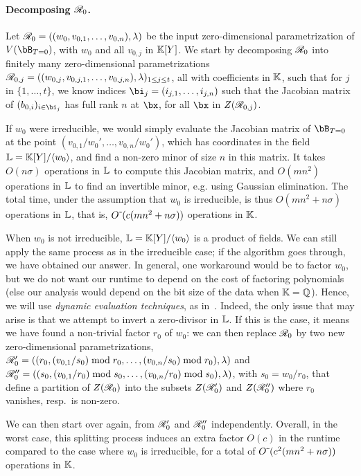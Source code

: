 \documentclass[12pt]{article}
\begin{document}
\paragraph{Decomposing $\mathscr{R}_0$.}
Let $\mathscr{R}_0 =((w_{0},v_{0,1},\dots,v_{0,n}),\lambda)$ be the input
zero-dimensional parametrization of $V(\bB_{T=0})$, with $w_0$ and all
$v_{0,j}$ in $\mathbb{K}[Y]$.  We start by decomposing $\mathscr{R}_0$ into
finitely many zero-dimensional parametrizations
$\mathscr{R}_{0,j}=((w_{0,j},v_{0,j,1},\dots,v_{0,j,n}),\lambda)_{1\le j\le
  t}$, all with coefficients in $\mathbb{K}$, such that for $j$ in
$\{1,\dots,t\}$, we know indices $\bi_j=(i_{j,1},\dots,i_{j,n})$ such that
the Jacobian matrix of $(b_{0,i})_{i \in \bi_j}$ has full rank $n$ at
$\bx$, for all $\bx$ in $Z(\mathscr{R}_{0,j})$.

If $w_0$ were irreducible, we would simply evaluate the Jacobian
matrix of $\bB_{T=0}$ at the point $(v_{0,1}/w_0',\dots,v_{0,n}/w_0')$,
which has coordinates in the field $\mathbb{L}=\mathbb{K}[Y]/\langle w_0 \rangle$,
and find a non-zero minor of size $n$ in this matrix. It takes
$O(n \sigma)$ operations in $\mathbb{L}$ to compute this Jacobian matrix, and
$O(mn^2)$ operations in $\mathbb{L}$ to find an invertible minor, e.g. using
Gaussian elimination. The total time, under the assumption that $w_0$
is irreducible, is thus $O(mn^2 + n\sigma)$ operations in $\mathbb{L}$, that is,
${O}{\,\tilde{ }\,}(c (mn^2 + n\sigma) )$ operations in $\mathbb{K}$.

When $w_0$ is not irreducible, $\mathbb{L}=\mathbb{K}[Y]/\langle w_0 \rangle$ is a
product of fields. We can still apply the same process as in the
irreducible case; if the algorithm goes through, we have obtained our
answer. In general, one workaround would be to factor $w_0$, but we do
not want our runtime to depend on the cost of factoring polynomials
(else our analysis would depend on the bit size of the data when
$\mathbb{K}=\mathbb{Q}$). Hence, we will use {\em dynamic evaluation
  techniques}, as in~\cite{D5}. Indeed, the only issue that may arise
is that we attempt to invert a zero-divisor in $\mathbb{L}$. If this is the case, it
means we have found a non-trivial factor $r_0$ of $w_0$: we can then
replace $\mathscr{R}_0$ by two new zero-dimensional parametrizations,
$\mathscr{R}'_0=((r_0,(v_{0,1}/s_0) \bmod r_0,\dots,(v_{0,n}/s_0)\bmod
r_0),\lambda)$
and
$\mathscr{R}''_0=((s_0,(v_{0,1}/r_0) \bmod s_0,\dots,(v_{0,n}/ r_0)\bmod
s_0),\lambda)$,
with $s_0=w_0/r_0$, that define a partition of $Z(\mathscr{R}_0)$ into the
subsets $Z(\mathscr{R}'_0)$ and $Z(\mathscr{R}''_0)$ where $r_0$ vanishes, resp.\
is non-zero.

We can then start over again, from $\mathscr{R}'_0$ and $\mathscr{R}''_0$
independently. Overall, in the worst case, this splitting process
induces an extra factor $O(c)$ in the runtime compared to the case
where $w_0$ is irreducible, for a total of ${O}{\,\tilde{ }\,}( c^2 (mn^2 + n\sigma) )$
operations in $\mathbb{K}$.
\end{document}

